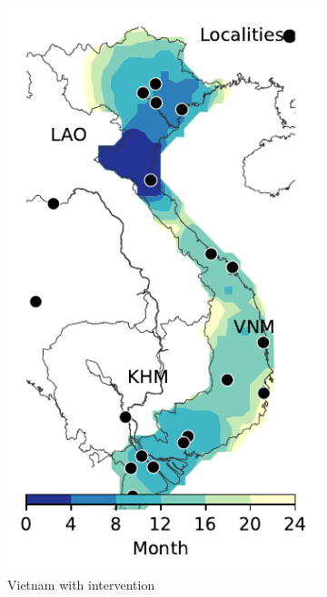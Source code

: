 \documentclass[11pt]{article}
\theoremstyle{definition}
\begin{document}
\begin{figure}[ht]
\begin{subfigure}[b]{.28\textwidth}
\includegraphics[width=\textwidth]{../cellular_automata/results/contour/VN_model-B_precip1-out-100_m1_l3.pdf}
\caption{Vietnam with intervention\label{fig:vnmBContourInt}}
\end{subfigure}
\begin{subfigure}[b]{.43\textwidth}

\end{subfigure}
\end{figure}
\end{document}
